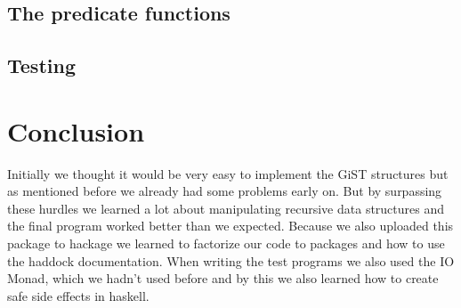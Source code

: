 \documentclass{scrartcl}
\begin{document}
\subsection{The predicate functions}

\subsection{Testing}


\section{Conclusion}

Initially we thought it would be very easy to implement the GiST structures but as mentioned before we already had some problems early on. But by surpassing 
these hurdles we learned a lot about manipulating recursive data structures and the final program worked better than we expected. Because we also uploaded
this package to hackage we learned to factorize our code to packages and how to use the haddock documentation. When writing the test programs we also used the IO Monad,
which we hadn't used before and by this we also learned how to create safe side effects in haskell. 
\end{document}
